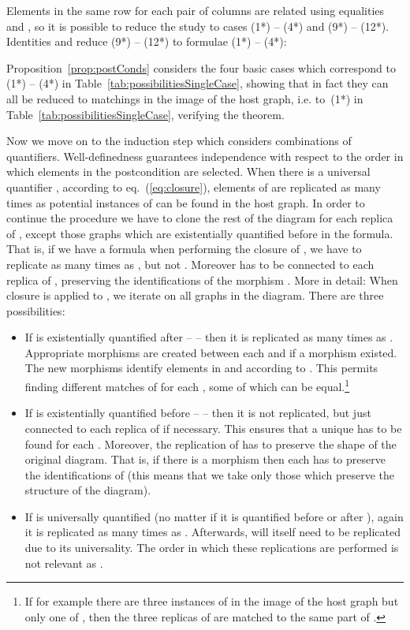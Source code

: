 \documentclass{fundam}
\newcommand{\proofend}{\hfill}
\begin{document}
Elements in the same row for each pair of columns are related using
equalities  and
, so it is possible
to reduce the study to cases (1*) -- (4*) and (9*) --
(12*). Identities  and  reduce (9*) -- (12*) to formulae (1*)
-- (4*):


Proposition~\ref{prop:postConds} considers the four basic cases which
correspond to (1*) -- (4*) in Table~\ref{tab:possibilitiesSingleCase},
showing that in fact they can all be reduced to matchings in the image
of the host graph, i.e. to~(1*) in
Table~\ref{tab:possibilitiesSingleCase}, verifying the theorem.

Now we move on to the induction step which considers combinations of
quantifiers. Well-definedness guarantees independence with respect to
the order in which elements  in the postcondition are
selected. When there is a universal quantifier , according
to eq.~(\ref{eq:closure}), elements of  are replicated as many
times as potential instances of  can be found in the host graph.
In order to continue the procedure we have to clone the rest of the
diagram for each replica of , except those graphs which are
existentially quantified before  in the formula. That is, if we
have a formula  when performing the
closure of , we have to replicate  as many times as , but not
.  Moreover  has to be connected to each replica of ,
preserving the identifications of the morphism .
More in detail: When closure is applied to , we iterate on all
graphs  in the diagram. There are three possibilities:

\begin{itemize}
\item If  is existentially quantified after  --  -- then it is replicated as many times as .
  Appropriate morphisms are created between each  and  if
  a morphism  existed. The new morphisms identify
  elements in  and  according to .  This permits finding
  different matches of  for each , some of which can be
  equal.\footnote{If for example there are three instances of  in
    the image of the host graph but only one of , then the three
    replicas of  are matched to the same part of .}
\item If  is existentially quantified before  --  -- then it is not replicated, but just connected to
  each replica of  if necessary. This ensures that a unique 
  has to be found for each . Moreover, the replication of  has
  to preserve the shape of the original diagram. That is, if there is
  a morphism  then each  has to
  preserve the identifications of  (this means that we take only
  those  which preserve the structure of the diagram).
\item If  is universally quantified (no matter if it is
  quantified before or after ), again it is replicated as many
  times as . Afterwards,  will itself need to be replicated
  due to its universality. The order in which these replications are
  performed is not relevant as . \proofend
\end{itemize}
\end{document}
